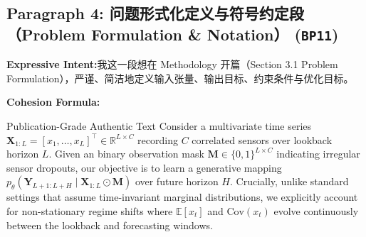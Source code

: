 \subsection*{Paragraph 4: 问题形式化定义与符号约定段（Problem Formulation \& Notation） (\texttt{BP11})}
\noindent\textbf{Expressive Intent:}\enspace 我这一段想在 Methodology 开篇（Section 3.1 Problem Formulation），严谨、简洁地定义输入张量、输出目标、约束条件与优化目标。\par
\noindent\textbf{Cohesion Formula:}\par\vspace{4pt}
\begin{ExampleBox}{Publication-Grade Authentic Text}
Consider a multivariate time series $\mathbf{X}_{1:L} = [x_1, \dots, x_L]^\top \in \mathbb{R}^{L \times C}$ recording $C$ correlated sensors over lookback horizon $L$. Given an binary observation mask $\mathbf{M} \in \{0, 1\}^{L \times C}$ indicating irregular sensor dropouts, our objective is to learn a generative mapping $p_\theta(\mathbf{Y}_{L+1:L+H} \mid \mathbf{X}_{1:L} \odot \mathbf{M})$ over future horizon $H$. Crucially, unlike standard settings that assume time-invariant marginal distributions, we explicitly account for non-stationary regime shifts where $\mathbb{E}[x_t]$ and $\text{Cov}(x_t)$ evolve continuously between the lookback and forecasting windows.
\end{ExampleBox}
